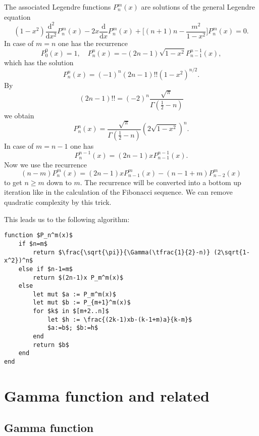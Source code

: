 \documentclass[a4paper,10pt,fleqn]{scrartcl}
\numberwithin{equation}{section}
\begin{document}
The associated Legendre functions $P_n^m(x)$ are solutions
of the general Legendre equation%
\begin{equation}
(1-x^2) \frac{\mathrm d^2}{\mathrm dx^2} P_n^m(x)
- 2x \frac{\mathrm d}{\mathrm dx} P_n^m(x)
+ \bigg[(n+1)n-\frac{m^2}{1-x^2}\bigg] P_n^m(x)=0.
\end{equation}
In case of $m=n$ one has the recurrence
\begin{equation}
P_0^0(x)=1, \quad P_n^n(x) = -(2n-1)\sqrt{1-x^2}P_{n-1}^{n-1}(x),
\end{equation}
which has the solution
\begin{equation}
P_n^n(x) = (-1)^n (2n-1)!! (1-x^2)^{n/2}.
\end{equation}
By
\begin{equation}
(2n-1)!! = (-2)^n \frac{\sqrt{\pi}}{\Gamma(\tfrac{1}{2}-n)}
\end{equation}
we obtain
\begin{equation}
P_n^n(x) = \frac{\sqrt{\pi}}{\Gamma(\tfrac{1}{2}-n)} (2\sqrt{1-x^2})^n.
\end{equation}
In case of $m=n-1$ one has
\begin{equation}
P_n^{n-1}(x) = (2n-1)xP_{n-1}^{n-1}(x).
\end{equation}
Now we use the recurrence
\begin{equation}
(n-m) P_n^m(x) = (2n-1)xP_{n-1}^m(x)-(n-1+m)P_{n-2}^m(x)
\end{equation}
to get $n\ge m$ down to $m$. The recurrence will be
converted into a bottom up iteration like in the calculation of the Fibonacci
sequence. We can remove quadratic complexity by this trick.

This leads us to the following algorithm:
\begin{lstlisting}[mathescape=true]
function $P_n^m(x)$
    if $n=m$
        return $\frac{\sqrt{\pi}}{\Gamma(\tfrac{1}{2}-n)} (2\sqrt{1-x^2})^n$
    else if $n-1=m$
        return $(2n-1)x P_m^m(x)$
    else
        let mut $a := P_m^m(x)$
        let mut $b := P_{m+1}^m(x)$
        for $k$ in $[m+2..n]$
            let $h := \frac{(2k-1)xb-(k-1+m)a}{k-m}$
            $a:=b$; $b:=h$
        end
        return $b$
    end
end
\end{lstlisting}

\section{Gamma function and related}
\subsection{Gamma function}
\end{document}
